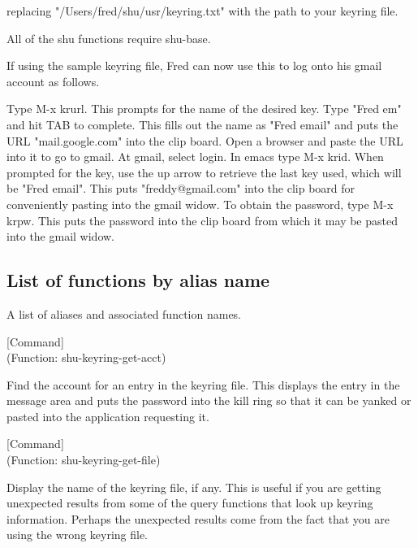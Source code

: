 replacing "/Users/fred/shu/usr/keyring.txt" with the path to your keyring file.

All of the shu functions require shu-base.

If using the sample keyring file, Fred can now use this to log onto his gmail
account as follows.

Type M-x krurl.  This prompts for the name of the desired key.  Type "Fred em"
and hit TAB to complete.  This fills out the name as "Fred email" and puts the
URL "mail.google.com" into the clip board.  Open a browser and paste the URL
into it to go to gmail.  At gmail, select login.  In emacs type M-x krid.
When prompted for the key, use the up arrow to retrieve the last key used,
which will be "Fred email".  This puts "freddy@gmail.com" into the clip board
for conveniently pasting into the gmail widow.  To obtain the password, type
M-x krpw.  This puts the password into the clip board from which it may be
pasted into the gmail widow.


\subsection{List of functions by alias name}

A list of aliases and associated function names.



\vspace{1em}
\noindent
{}
\usebox{\funcname}
 \hfill [Command]\\%
 (Function: shu-keyring-get-acct)

\begin{doc-string}
Find the account for an entry in the keyring file.  This displays the entry in the message
area and puts the password into the kill ring so that it can be yanked or pasted into the application
requesting it.
\end{doc-string}

\vspace{1em}
\noindent
{}
\usebox{\funcname}
 \hfill [Command]\\%
 (Function: shu-keyring-get-file)

\begin{doc-string}
Display the name of the keyring file, if any.  This is useful if you are
getting unexpected results from some of the query functions that look up keyring
information.  Perhaps the unexpected results come from the fact that you are
using the wrong keyring file.
\end{doc-string}

